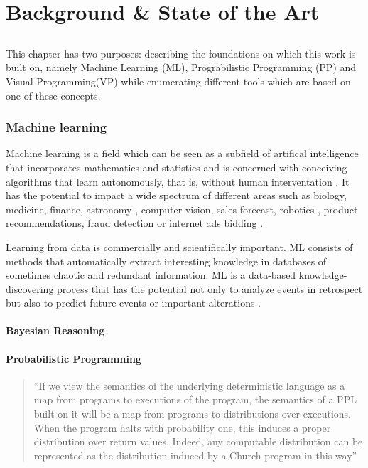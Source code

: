 \chapter{Background & State of the Art} \label{chap:sota}

\section*{}

This chapter has two purposes: describing the foundations on which this work
is built on, namely Machine Learning (ML), Prograbilistic Programming (PP) and
Visual Programming(VP) while enumerating different tools which are based
on one of these concepts.

\subsection{Machine learning}

Machine learning is a field which can be seen as a subfield of artifical
intelligence that incorporates mathematics and statistics and is concerned
with conceiving algorithms that learn autonomously, that is, without human
interventation \cite{mlbrit}\cite{mlnot}.
It has the potential to impact a wide spectrum of
different areas such as biology, medicine, finance, astronomy
\cite{Amatriain:2013:BDU:2541176.2514691}, computer vision, sales forecast,
robotics \cite{intml}, product recommendations, fraud detection or
internet ads bidding \cite{SciPy}.

Learning from data is commercially and scientifically important. ML consists of
methods that automatically extract interesting knowledge in databases of sometimes chaotic and
redundant information. ML is a data-based knowledge-discovering process that
has the potential not only to analyze events in retrospect but also to predict
future events or important alterations \cite{mapt}.

\subsubsection{Bayesian Reasoning}



\subsubsection{Probabilistic Programming}

\begin{quote}
  ``If we view the semantics of the underlying deterministic language as a map
  from programs to executions of the program, the semantics of a PPL built on it
   will be a map from programs to distributions over executions. When the
   program halts with probability one, this induces a proper distribution over
   return values. Indeed, any computable distribution can be represented as the
   distribution induced by a Church program in this way''~\cite{Freer2012}
\end{quote}

